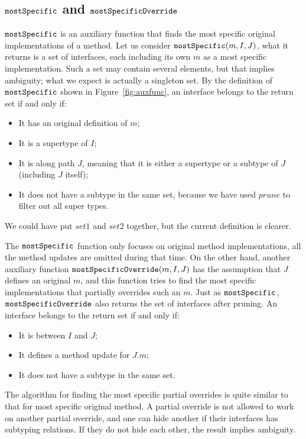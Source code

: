 \subsection{$\texttt{mostSpecific}$ and $\texttt{mostSpecificOverride}$}

$\texttt{mostSpecific}$ is an auxiliary function that finds the most specific original implementations of a method. Let us consider $\texttt{mostSpecific}(m, I, J)$, what it returns is a set of interfaces, each including its own $m$ as a most specific implementation. Such a set may contain several elements, but that implies ambiguity; what we expect is actually a singleton set. By the definition of $\texttt{mostSpecific}$ shown in Figure~\ref{fig:auxfunc}, an interface belongs to the return set if and only if:
\begin{itemize}
    \item It has an original definition of $m$;
    \item It is a supertype of $I$;
    \item It is along path $J$, meaning that it is either a supertype or a subtype of $J$ (including $J$ itself);
    \item It does not have a subtype in the same set, because we have used $prune$ to filter out all super types.
\end{itemize}
We could have put $set1$ and $set2$ together, but the current
definition is clearer.

The $\texttt{mostSpecific}$ function only focuses on original method implementations, all the method updates are omitted during that time. On the other hand, another auxiliary function $\texttt{mostSpecificOverride}(m, I, J)$ has the assumption that $J$ defines an original $m$, and this function tries to find the most specific implementations that partially overrides such an $m$. Just as $\texttt{mostSpecific}$, $\texttt{mostSpecificOverride}$ also returns the set of interfaces after pruning. An interface belongs to the return set if and only if:
\begin{itemize}
    \item It is between $I$ and $J$;
    \item It defines a method update for $J.m$;
    \item It does not have a subtype in the same set.
\end{itemize}
The algorithm for finding the most specific partial overrides is quite similar to that for most specific original method. A partial override is not allowed to work on another partial override, and one can hide another if their interfaces has subtyping relations. If they do not hide each other, the result implies ambiguity.

